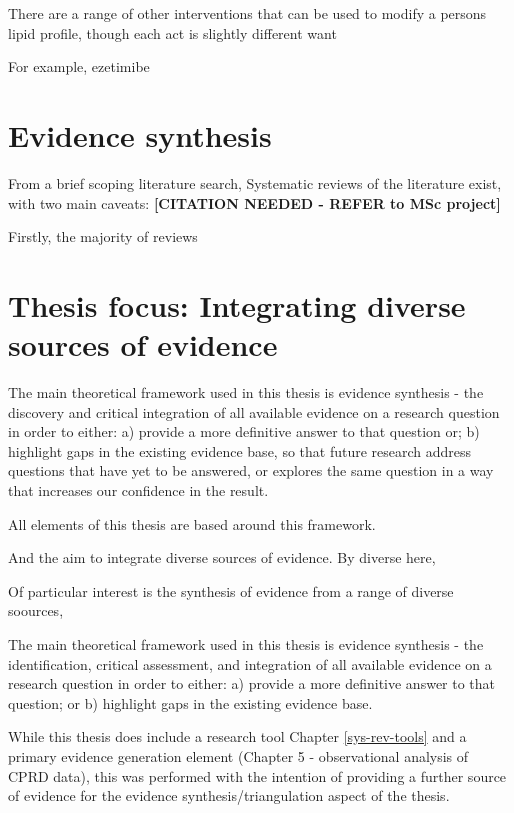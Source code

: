 \documentclass[a4paper, twoside]{templates/ociamthesis}
\begin{document}
There are a range of other interventions that can be used to modify a persons lipid profile, though each act is slightly different want

For example, ezetimibe

\hypertarget{evidence-synthesis}{%
\section{Evidence synthesis}\label{evidence-synthesis}}

From a brief scoping literature search, Systematic reviews of the literature exist, with two main caveats: \textbf{{[}CITATION NEEDED - REFER to MSc project{]}}

Firstly, the majority of reviews

\hypertarget{thesis-focus-integrating-diverse-sources-of-evidence}{%
\section{Thesis focus: Integrating diverse sources of evidence}\label{thesis-focus-integrating-diverse-sources-of-evidence}}

The main theoretical framework used in this thesis is evidence synthesis - the discovery and critical integration of all available evidence on a research question in order to either: a) provide a more definitive answer to that question or; b) highlight gaps in the existing evidence base, so that future research address questions that have yet to be answered, or explores the same question in a way that increases our confidence in the result.

All elements of this thesis are based around this framework.

And the aim to integrate diverse sources of evidence. By diverse here,

Of particular interest is the synthesis of evidence from a range of diverse soources,

The main theoretical framework used in this thesis is evidence synthesis - the identification, critical assessment, and integration of all available evidence on a research question in order to either: a) provide a more definitive answer to that question; or b) highlight gaps in the existing evidence base.

While this thesis does include a research tool Chapter \ref{sys-rev-tools} and a primary evidence generation element (Chapter 5 - observational analysis of CPRD data), this was performed with the intention of providing a further source of evidence for the evidence synthesis/triangulation aspect of the thesis.
\end{document}
